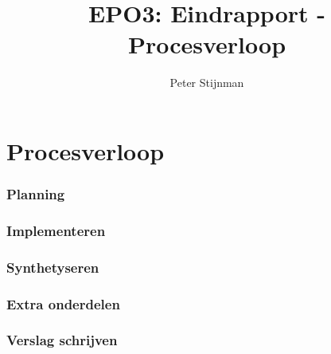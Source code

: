 \documentclass{scrartcl} %
\author{Peter Stijnman}
\title{EPO3: Eindrapport - Procesverloop}
\begin{document}
\chapter{Procesverloop}
\label{ch:procesverloop}

\subsection{ Planning}



\subsection{Implementeren}



\subsection{Synthetyseren}



\subsection{Extra onderdelen}



\subsection{Verslag schrijven}
\end{document}
